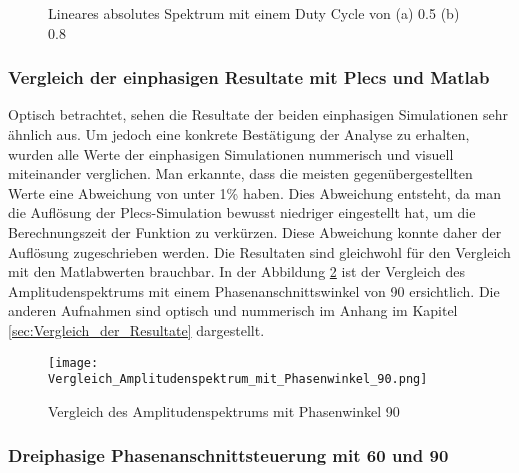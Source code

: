 \begin{figure}[ht!]
	\centering
	\qquad
	\caption{Lineares absolutes Spektrum mit einem Duty Cycle von (a) 0.5 (b) 0.8}
	\label{fig:plecs_Schwingungspakete_absolut log}
\end{figure}

\newpage
\subsubsection{Vergleich der einphasigen Resultate mit Plecs und Matlab} \label{sec:Vergleich_Plecs_Matlab}
Optisch betrachtet, sehen die Resultate der beiden einphasigen Simulationen sehr ähnlich aus. Um jedoch eine konkrete Bestätigung der Analyse zu erhalten, wurden alle Werte der einphasigen Simulationen nummerisch und visuell miteinander verglichen. Man erkannte, dass die meisten gegenübergestellten Werte eine Abweichung von unter 1\% haben. Dies Abweichung entsteht, da man die Auflösung der Plecs-Simulation bewusst niedriger eingestellt hat, um die Berechnungszeit der Funktion zu verkürzen. Diese Abweichung konnte daher der Auflösung zugeschrieben werden. Die Resultaten sind gleichwohl für den Vergleich mit den Matlabwerten brauchbar. In der Abbildung \ref{fig:Amplitudenspektrum mit Phasenwinkel 90grad} ist der Vergleich des Amplitudenspektrums mit einem Phasenanschnittswinkel von 90\textdegree\hspace{0.02cm} ersichtlich. Die anderen Aufnahmen sind optisch und nummerisch im Anhang im Kapitel \ref{sec:Vergleich_der_Resultate} dargestellt.


\begin{figure}[ht!]
	\centering
	\texttt{[image: Vergleich\_Amplitudenspektrum\_mit\_Phasenwinkel\_90.png]}	
	\caption{Vergleich des Amplitudenspektrums mit Phasenwinkel 90\textdegree}
	\label{fig:Amplitudenspektrum mit Phasenwinkel 90grad}
\end{figure}


\subsubsection{Dreiphasige Phasenanschnittsteuerung mit 60\textdegree\hspace{0.02cm} und 90\textdegree}


